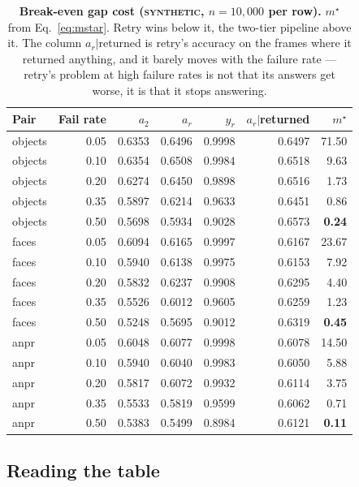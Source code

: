 \documentclass[11pt,a4paper]{article}
\newcommand{\synth}{\textsc{synthetic}}
\begin{document}
\begin{table}[t]
\centering\small
\begin{tabular}{lrrrrrr}
\toprule
\textbf{Pair} & \textbf{Fail rate} & \textbf{$a_2$} & \textbf{$a_r$} & \textbf{$y_r$} & \textbf{$a_r|$returned} & \textbf{$m^\star$} \\
\midrule
objects & 0.05 & 0.6353 & 0.6496 & 0.9998 & 0.6497 & 71.50 \\
objects & 0.10 & 0.6354 & 0.6508 & 0.9984 & 0.6518 & 9.63 \\
objects & 0.20 & 0.6274 & 0.6450 & 0.9898 & 0.6516 & 1.73 \\
objects & 0.35 & 0.5897 & 0.6214 & 0.9633 & 0.6451 & 0.86 \\
objects & 0.50 & 0.5698 & 0.5934 & 0.9028 & 0.6573 & \textbf{0.24} \\
\midrule
faces & 0.05 & 0.6094 & 0.6165 & 0.9997 & 0.6167 & 23.67 \\
faces & 0.10 & 0.5940 & 0.6138 & 0.9975 & 0.6153 & 7.92 \\
faces & 0.20 & 0.5832 & 0.6237 & 0.9908 & 0.6295 & 4.40 \\
faces & 0.35 & 0.5526 & 0.6012 & 0.9605 & 0.6259 & 1.23 \\
faces & 0.50 & 0.5248 & 0.5695 & 0.9012 & 0.6319 & \textbf{0.45} \\
\midrule
anpr & 0.05 & 0.6048 & 0.6077 & 0.9998 & 0.6078 & 14.50 \\
anpr & 0.10 & 0.5940 & 0.6040 & 0.9983 & 0.6050 & 5.88 \\
anpr & 0.20 & 0.5817 & 0.6072 & 0.9932 & 0.6114 & 3.75 \\
anpr & 0.35 & 0.5533 & 0.5819 & 0.9599 & 0.6062 & 0.71 \\
anpr & 0.50 & 0.5383 & 0.5499 & 0.8984 & 0.6121 & \textbf{0.11} \\
\bottomrule
\end{tabular}
\caption{\textbf{Break-even gap cost (\synth, $n=10{,}000$ per row).}
$m^\star$ from Eq.~\ref{eq:mstar}. Retry wins below it, the two-tier pipeline
above it. The column $a_r|$returned is retry's accuracy on the frames where it
returned anything, and it barely moves with the failure rate --- retry's problem
at high failure rates is not that its answers get worse, it is that it stops
answering.}
\label{tab:regime}
\end{table}

\subsection{Reading the table}
\end{document}
